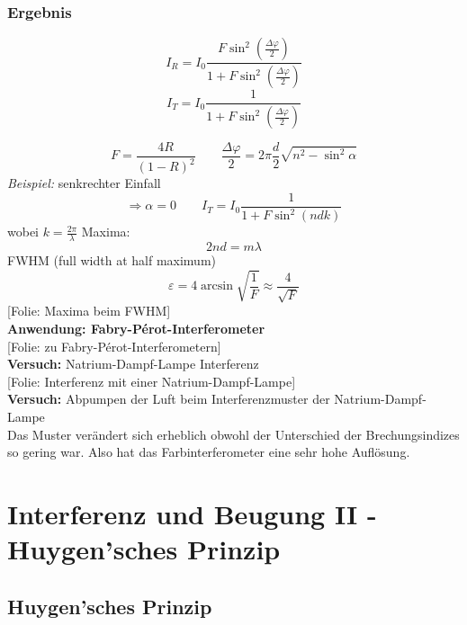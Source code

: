 \documentclass[titlepage,11pt,a4paper,ngerman]{report}
\newcommand{\folie}[1]{\color{gray}[Folie: #1]\color{black}}
\newcommand{\versuch}[1]{\color{red!50!black} \textbf{Versuch:} \color{black} #1\\ }
\newcommand{\lcom}[1]{\color{MidnightBlue}#1\color{black}}
\renewcommand{\epsilon}{\varepsilon}
\newcommand{\frbox}[2]{\begin{tcolorbox}[colback=white,colframe=red!75!black,fonttitle=\bfseries,title=#1]#2\end{tcolorbox}}
\begin{document}
\subsubsection{Ergebnis}

\begin{center}
	\begin{minipage}{.6\linewidth}
		\frbox{Airy-Formeln}{
			\begin{equation*}
			I_R = I_0 \frac{F \sin^2 \left(\frac{\Delta \varphi}{2}\right)}{1 + F \sin^2\left(\frac{\Delta \varphi}{2}\right)}
			\end{equation*}
			\begin{equation*}
			I_T = I_0 \frac{1}{1 + F \sin^2 \left(\frac{\Delta \varphi}{2}\right)}
			\end{equation*}
		}
	\end{minipage}
\end{center}
\begin{equation*}
F = \frac{4 R}{(1-R)^2} \qquad \frac{\Delta \varphi}{2} = 2 \pi \frac{d}{2} \sqrt{n^2 - \sin^2 \alpha}
\end{equation*}
\emph{Beispiel:} senkrechter Einfall
\begin{equation*}
\Rightarrow \alpha = 0 \qquad I_T = I_0 \frac{1}{1 + F \sin^2 (n d k)}
\end{equation*}
wobei $ k = \frac{2 \pi}{\lambda} $
Maxima: $$ 2 n d = m \lambda $$
FWHM (full width at half maximum)
$$ \epsilon = 4 \arcsin\sqrt{\frac{1}{F}} \approx \frac{4}{\sqrt{F}} $$
\folie{Maxima beim FWHM}\\
\textbf{Anwendung: Fabry-P\'erot-Interferometer}\\[5pt]
\folie{zu Fabry-P\'erot-Interferometern}\\
\versuch{Natrium-Dampf-Lampe Interferenz}
\folie{Interferenz mit einer Natrium-Dampf-Lampe}\\
\versuch{Abpumpen der Luft beim Interferenzmuster der Natrium-Dampf-Lampe}
\lcom{Das Muster verändert sich erheblich obwohl der Unterschied der Brechungsindizes so gering war. Also hat das Farbinterferometer eine sehr hohe Auflösung. }


\section{Interferenz und Beugung II - Huygen'sches Prinzip}

\subsection{Huygen'sches Prinzip}
\end{document}
